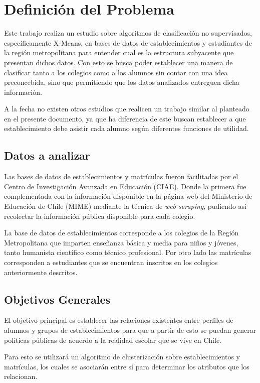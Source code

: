 \chapter{Definici\'on del Problema}

Este trabajo realiza un estudio sobre algoritmos de clasificación no supervisados, específicamente X-Means, en bases de datos de establecimientos y estudiantes de la región metropolitana para entender cual es la estructura subyacente que presentan dichos datos. Con esto se busca poder establecer una manera de clasificar tanto a los colegios como a los alumnos sin contar con una idea preconcebida, sino que permitiendo que los datos analizados entreguen dicha información.

A la fecha no existen otros estudios que realicen un trabajo similar al planteado en el presente documento, ya que ha diferencia de este buscan establecer a que establecimiento debe asistir cada alumno según diferentes funciones de utilidad.


\section{Datos a analizar}

Las bases de datos de establecimientos y matrículas fueron facilitadas por el Centro de Investigación Avanzada en Educación (CIAE). Donde la primera fue complementada con la información disponible en la página web del Ministerio de Educación de Chile (MIME\cite{MIME}) mediante la técnica de \textit{web scraping}, pudiendo así recolectar la información pública disponible para cada colegio.

La base de datos de establecimientos corresponde a los colegios de la Región Metropolitana que imparten enseñanza básica y media para niños y jóvenes, tanto humanista científico como técnico profesional. Por otro lado las matrículas corresponden a estudiantes que se encuentran inscritos en los colegios anteriormente descritos. 

\section{Objetivos Generales}

El objetivo principal es establecer las relaciones existentes entre perfiles de alumnos y grupos de establecimientos para que a partir de esto se puedan generar políticas públicas de acuerdo a la realidad escolar que se vive en Chile.

Para esto se utilizará un algoritmo de clusterización sobre establecimientos y matrículas, los cuales se asociarán entre sí para determinar los atributos que los relacionan.

